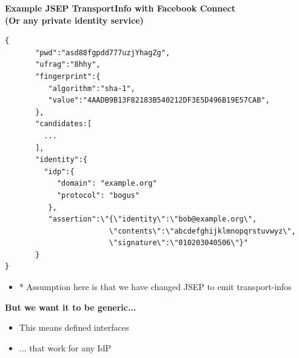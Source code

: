 \documentclass[helvetica]{seminar}
\newcommand{\heading}[1]{%
  \begin{center} 
    \large\bf 
    #1 
  \end{center} 
  \vspace{.4 in}}
\begin{document}
\begin{slide}
\heading{Example JSEP TransportInfo with Facebook Connect\\(Or any private identity service)}

\vspace{-.3in}
\begin{tiny}
\begin{verbatim}
{
       "pwd":"asd88fgpdd777uzjYhagZg",
       "ufrag":"8hhy",
       "fingerprint":{
          "algorithm":"sha-1",
          "value":"4AADB9B13F82183B540212DF3E5D496B19E57CAB",
       },
       "candidates:[
         ...
       ],
       "identity":{
         "idp":{
            "domain": "example.org"
            "protocol": "bogus"
          },
          "assertion":\"{\"identity\":\"bob@example.org\",
                        \"contents\":\"abcdefghijklmnopqrstuvwyz\",
                        \"signature\":\"010203040506\"}"
       }
}
\end{verbatim}
\end{tiny}                      

\begin{itemize}
\item[] * Assumption here is that we have changed JSEP to emit transport-infos
\end{itemize}

\end{slide}



\begin{slide}
\heading{But we want it to be generic...}

\begin{itemize}
\item This means defined interfaces
\item ... that work for any IdP
\end{itemize}

\end{slide}
\end{document}

